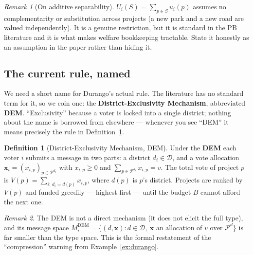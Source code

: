 \documentclass[11pt,letterpaper]{article}
\theoremstyle{definition}
\newtheorem{definition}{Definition}[section]
\theoremstyle{plain}
\theoremstyle{remark}
\newtheorem*{remark}{Remark}
\newcommand{\D}{\mathcal{D}}
\newcommand{\Pset}{\mathcal{P}}
\newcommand{\votes}{v}
\newcommand{\budget}{B}
\newcommand{\DEM}{\text{DEM}}
\begin{document}
\begin{remark}[On additive separability]
$U_i(S)=\sum_{p\in S}u_i(p)$ assumes no complementarity or substitution across projects (a new
park and a new road are valued independently). It is a genuine restriction, but it is standard in
the PB literature and it is what makes welfare bookkeeping tractable. State it honestly as an
assumption in the paper rather than hiding it.
\end{remark}

\subsection{The current rule, named}

\begin{naming}
We need a short name for Durango's actual rule. The literature has no standard term for it, so we
coin one: the \textbf{District-Exclusivity Mechanism}, abbreviated \textbf{DEM}. ``Exclusivity''
because a voter is locked into a single district; nothing about the name is borrowed from
elsewhere --- whenever you see ``DEM'' it means precisely the rule in Definition~\ref{def:dem}.
\end{naming}

\begin{definition}[District-Exclusivity Mechanism, DEM]
\label{def:dem}
Under the \textbf{DEM} each voter $i$ submits a message in two parts: a district $d_i\in\D$, and a
vote allocation $\mathbf{x}_i=(x_{i,p})_{p\in\Pset^{d_i}}$ with $x_{i,p}\ge0$ and
$\sum_{p\in\Pset^{d_i}}x_{i,p}=\votes$. The total vote of project $p$ is
$V(p)=\sum_{i:\,d_i=d(p)}x_{i,p}$, where $d(p)$ is $p$'s district. Projects are ranked by $V(p)$
and funded greedily --- highest first --- until the budget $\budget$ cannot afford the next one.
\end{definition}

\begin{remark}
The DEM is not a direct mechanism (it does not elicit the full type), and its message space
$M_i^{\DEM}=\{(d,\mathbf{x}):d\in\D,\ \mathbf{x}\text{ an allocation of }\votes\text{ over }\Pset^d\}$
is far smaller than the type space. This is the formal restatement of the ``compression'' warning
from Example~\ref{ex:durango}.
\end{remark}

\end{document}
